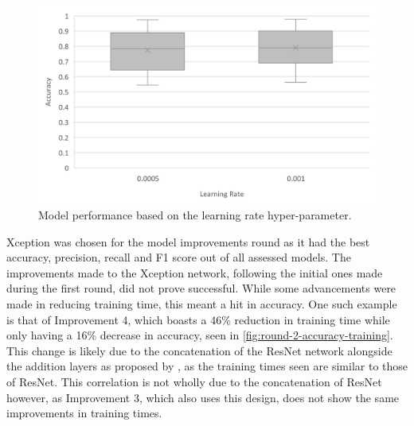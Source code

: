 \begin{figure}[H]
    \centering
    \includegraphics[width=\textwidth]{figures/round-1-learning-rate.png}
    \caption{Model performance based on the learning rate hyper-parameter.}
    \label{fig:round-1-learning-rate}
\end{figure}

Xception was chosen for the model improvements round as it had the best accuracy, precision, recall and F1 score out of all assessed models. The improvements made to the Xception network, following the initial ones made during the first round, did not prove successful. While some advancements were made in reducing training time, this meant a hit in accuracy. One such example is that of Improvement 4, which boasts a 46\% reduction in training time while only having a 16\% decrease in accuracy, seen in \autoref{fig:round-2-accuracy-training}. This change is likely due to the concatenation of the ResNet network alongside the addition layers as proposed by \cite{fitriasari2021improvement}, as the training times seen are similar to those of ResNet. This correlation is not wholly due to the concatenation of ResNet however, as Improvement 3, which also uses this design, does not show the same improvements in training times.

